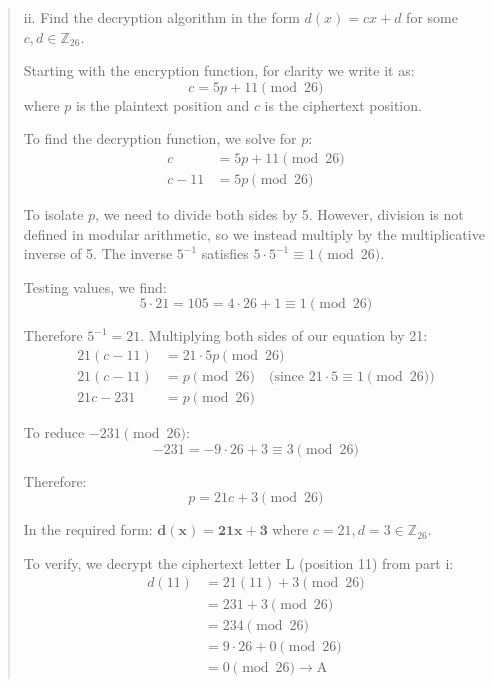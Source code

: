 \documentclass[12pt]{article}
\begin{document}
\begin{quote}
\vspace{0.5cm}

ii. Find the decryption algorithm in the form $d(x) = cx + d$ for some $c, d \in \mathbb{Z}_{26}$.

\vspace{0.3cm}

Starting with the encryption function, for clarity we write it as:
$$c = 5p + 11 \pmod{26}$$
where $p$ is the plaintext position and $c$ is the ciphertext position.

To find the decryption function, we solve for $p$:
\begin{align*}
c &= 5p + 11 \pmod{26}\\
c - 11 &= 5p \pmod{26}
\end{align*}

To isolate $p$, we need to divide both sides by 5. However, division is not defined in modular arithmetic, so we instead multiply by the multiplicative inverse of 5. The inverse $5^{-1}$ satisfies $5 \cdot 5^{-1} \equiv 1 \pmod{26}$.

Testing values, we find:
$$5 \cdot 21 = 105 = 4 \cdot 26 + 1 \equiv 1 \pmod{26}$$

Therefore $5^{-1} = 21$. Multiplying both sides of our equation by 21:
\begin{align*}
21(c - 11) &= 21 \cdot 5p \pmod{26}\\
21(c - 11) &= p \pmod{26} \quad \text{(since } 21 \cdot 5 \equiv 1 \pmod{26}\text{)}\\
21c - 231 &= p \pmod{26}
\end{align*}

To reduce $-231 \pmod{26}$:
$$-231 = -9 \cdot 26 + 3 \equiv 3 \pmod{26}$$

Therefore:
$$p = 21c + 3 \pmod{26}$$

In the required form: $\mathbf{d(x) = 21x + 3}$ where $c = 21, d = 3 \in \mathbb{Z}_{26}$.

\vspace{0.3cm}

To verify, we decrypt the ciphertext letter L (position 11) from part i:
\begin{align*}
d(11) &= 21(11) + 3 \pmod{26}\\
&= 231 + 3 \pmod{26}\\
&= 234 \pmod{26}\\
&= 9 \cdot 26 + 0 \pmod{26}\\
&= 0 \pmod{26} \rightarrow \text{A}
\end{align*}


\end{quote}
\end{document}
